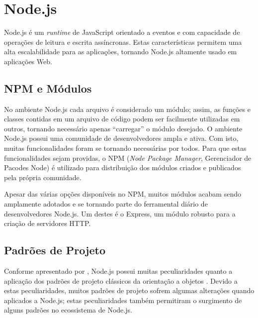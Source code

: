 
\section{Node.js}
\label{tec:node}

Node.js é um \textit{runtime} de JavaScript orientado a eventos \cite{NODEORG:2009} e com capacidade de operações de leitura e escrita assíncronas. Estas características permitem uma alta escalabilidade para as aplicações, tornando Node.js altamente usado em aplicações Web.


\subsection{NPM e Módulos}
\label{node:mod}

No ambiente Node.js cada arquivo é considerado um módulo; assim, as funções e classes contidas em um arquivo de código podem ser facilmente utilizadas em outros, tornando necessário apenas ``carregar'' o módulo desejado. O ambiente Node.js possui uma comunidade de desenvolvedores ampla e ativa. Com isto, muitas funcionalidades foram se tornando necessárias por todos. Para que estas funcionalidades sejam providas, o NPM (\textit{Node Package Manager}, Gerenciador de Pacodes Node) é utilizado para distribuição dos módulos criados e publicados pela própria comunidade.

Apesar das várias opções disponíveis no NPM, muitos módulos acabam sendo amplamente adotados e se tornando parte do ferramental diário de desenvolvedores Node.js. Um destes é o Express, um módulo robusto para a criação de servidores HTTP.


\subsection{Padrões de Projeto}
\label{node:design}

Conforme apresentado por , Node.js possui muitas peculiaridades quanto a aplicação dos padrões de projeto clássicos da orientação a objetos \cite{GAMMA:1995}. Devido a estas peculiaridades, muitos padrões de projeto sofrem algumas alterações quando aplicados a Node.js; estas peculiaridades também permitiram o surgimento de alguns padrões no ecossistema de Node.js.

